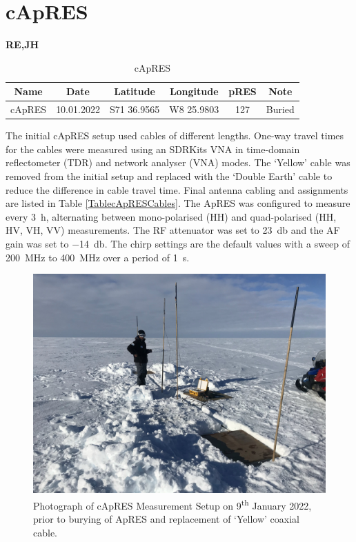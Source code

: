 \documentclass[a4paper,12pt]{article}
\begin{document}
\pagebreak
\section{cApRES}
\label{SeccApRES}
\textbf{RE,JH}\\

\begin{table}[H]
  \small
  \centering
  \begin{tabular}[width=\textwidth]{c c c c c c}
    \rowcolor{gray!50}
    Name & Date & Latitude & Longitude & pRES & Note\\
    \hline
    cApRES & 10.01.2022& S71 36.9565 & W8 25.9803 & 127 & Buried\\
    \hline
  \end{tabular}
  \caption{cApRES}
  \label{Table_cApRES}
\end{table}

The initial cApRES setup used cables of different lengths.  One-way travel times
for the cables were measured using an SDRKits VNA in time-domain reflectometer
(TDR) and network analyser (VNA) modes.  The `Yellow' cable was removed from the
initial setup and replaced with the `Double Earth' cable to reduce the
difference in cable travel time.  Final antenna cabling and assignments are
listed in Table \ref{TablecApRESCables}. 
The ApRES was configured to measure every \SI{3}{\hour}, alternating between 
mono-polarised (HH) and quad-polarised (HH, HV, VH, VV) measurements.  The RF
attenuator was set to \SI{23}{\decibel} and the AF gain was set to 
\SI{-14}{\decibel}.  The chirp settings are the default values with a sweep of
\SI{200}{\mega\hertz} to \SI{400}{\mega\hertz} over a period of \SI{1}{\second}.

\begin{figure}[H]
  \centering
  \includegraphics[width=0.6\linewidth]{Figures/CApRES/CApRES_Setup.jpg}
  \caption{Photograph of cApRES Measurement Setup on 9\textsuperscript{th}
  January 2022, prior to burying of ApRES and replacement of `Yellow' coaxial
  cable.}
  \label{FigCApRESSetupImage}
\end{figure}
\end{document}
